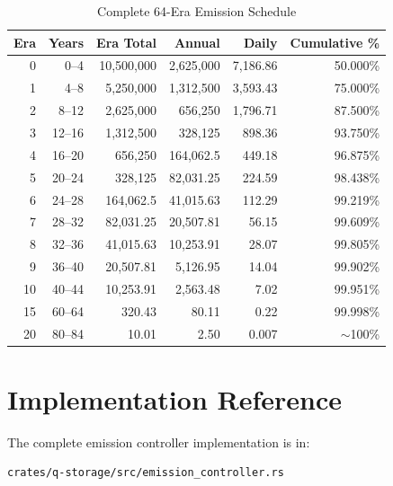 \documentclass[11pt,a4paper]{article}
\begin{document}
\begin{table}[H]
\centering
\small
\caption{Complete 64-Era Emission Schedule}
\begin{tabular}{@{}rrrrrr@{}}
\toprule
\textbf{Era} & \textbf{Years} & \textbf{Era Total} & \textbf{Annual} & \textbf{Daily} & \textbf{Cumulative \%} \\
\midrule
0  & 0--4     & 10,500,000     & 2,625,000     & 7,186.86 & 50.000\% \\
1  & 4--8     &  5,250,000     & 1,312,500     & 3,593.43 & 75.000\% \\
2  & 8--12    &  2,625,000     &   656,250     & 1,796.71 & 87.500\% \\
3  & 12--16   &  1,312,500     &   328,125     &   898.36 & 93.750\% \\
4  & 16--20   &    656,250     &   164,062.5   &   449.18 & 96.875\% \\
5  & 20--24   &    328,125     &    82,031.25  &   224.59 & 98.438\% \\
6  & 24--28   &    164,062.5   &    41,015.63  &   112.29 & 99.219\% \\
7  & 28--32   &     82,031.25  &    20,507.81  &    56.15 & 99.609\% \\
8  & 32--36   &     41,015.63  &    10,253.91  &    28.07 & 99.805\% \\
9  & 36--40   &     20,507.81  &     5,126.95  &    14.04 & 99.902\% \\
10 & 40--44   &     10,253.91  &     2,563.48  &     7.02 & 99.951\% \\
15 & 60--64   &        320.43  &        80.11  &     0.22 & 99.998\% \\
20 & 80--84   &         10.01  &         2.50  &     0.007 & $\sim$100\% \\
\bottomrule
\end{tabular}
\end{table}

\section{Implementation Reference}

The complete emission controller implementation is in:
\begin{verbatim}
crates/q-storage/src/emission_controller.rs
\end{verbatim}
\end{document}
